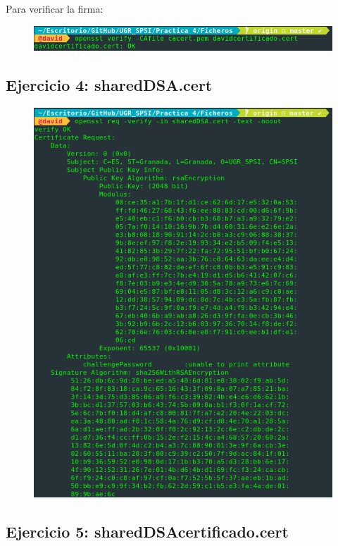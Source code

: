 \documentclass[10pt,a4paper,spanish]{report}
\begin{document}
\noindent
Para verificar la firma:

\begin{figure}[!hbp]
 \centering  \includegraphics[width=1\textwidth]{./Imagenes/6_4.png}
\end{figure}


\newpage
\subsection*{Ejercicio 4: sharedDSA.cert}

\begin{figure}[!hbp]
 \centering  \includegraphics[width=1\textwidth]{./Imagenes/6_5.png}
\end{figure}

\newpage
\subsection*{Ejercicio 5: sharedDSAcertificado.cert}
\end{document}
